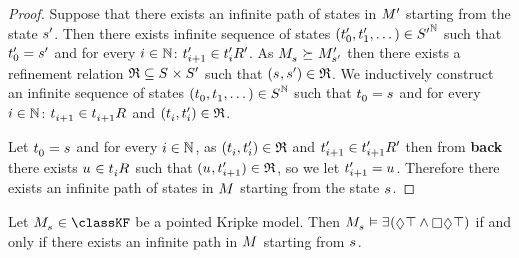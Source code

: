 \begin{proof}
Suppose that there exists an infinite path of states in ${M^{\prime}_{}}$ starting from the state ${s}^{\prime}$.
Then there exists infinite sequence of states $({t}^{\prime}_0, {t}^{\prime}_1, \dots) \in {S^{\prime}}^{\mathbb{N}}$ such that ${t}^{\prime}_0 = {s}^{\prime}$ and for every $i \in \mathbb{N}$: ${t}^{\prime}_{i + 1} \in {{t}^{\prime}_i} {R^{\prime}_{}}$.
As $\kPModel{\kStateS} \simulates \kPModelP{\kStateSP}$ then there exists a refinement relation $\refinement \subseteq \kStates \times \kStatesP$ such that $(\kStateS, \kStateSP) \in \refinement$.
We inductively construct an infinite sequence of states $(\kStateT_0, \kStateT_1, \dots) \in \kStates^\naturals$ such that $\kStateT_0 = \kStateS$ and for every $i \in \mathbb{N}$: $\kStateT_{i + 1} \in \kSuccessors{}{\kStateT_{i + 1}}$ and $(\kStateT_i, \kStateTP_i) \in \refinement$.

Let $\kStateT_0 = \kStateS$ and for every $i \in \mathbb{N}$, as $(\kStateT_i, \kStateTP_i) \in \refinement$ and ${t}^{\prime}_{i + 1} \in {{t}^{\prime}_{i + 1}} {R^{\prime}_{}}$ then from {\bf back} there exists $\kStateU \in \kSuccessors{}{\kStateT_i}$ such that $(\kStateU, \kStateTP_{i + 1}) \in \refinement$, so we let $\kStateTP_{i + 1} = \kStateU$.
Therefore there exists an infinite path of states in $\kModel$ starting from the state $\kStateS$.
\end{proof}

\begin{lemma}\label{refinements-infinite-paths-formula}
Let $\kPModel{\kStateS} \in \classKF$ be a pointed Kripke model.
Then $\kPModel{\kStateS} \entails \somerefs(\possible \top \land \necessary \possible \top)$ if and only if there exists an infinite path in $\kModel$ starting from $\kStateS$.
\end{lemma}

